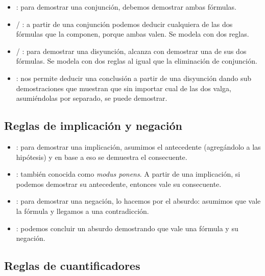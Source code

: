 \begin{itemize}
    \item {}: para demostrar una conjunción, debemos demostrar ambas fórmulas.
    \item {} / : a partir de una conjunción podemos
    deducir cualquiera de las dos fórmulas que la componen, porque ambas valen.
    Se modela con dos reglas.
    \item {} / : para demostrar una disyunción, alcanza con
    demostrar una de sus dos fórmulas. Se modela con dos reglas al igual que la
    eliminación de conjunción.
    \item {}: nos permite deducir una conclusión a partir de una
    disyunción dando sub demostraciones que muestran que sin importar cual de
    las dos valga, asumiéndolas por separado, se puede demostrar.
\end{itemize}

\subsection{Reglas de implicación y negación}

\begin{multicols}{2}
    \proofTreeImpI
    \proofTreeImpE
\end{multicols}

\proofSpacing

\begin{multicols}{2}
    \proofTreeNotI
    \proofTreeNotE
\end{multicols}

\begin{itemize}
    \item {}: para demostrar una implicación, asumimos el antecedente
    (agregándolo a las hipótesis) y en base a eso se demuestra el consecuente.
    \item {}: también conocida como \textit{modus ponens}. A partir de
    una implicación, si podemos demostrar su antecedente, entonces vale su consecuente.
    \item {}: para demostrar una negación, lo hacemos por el absurdo:
    asumimos que vale la fórmula y llegamos a una contradicción.
    \item {}: podemos concluir un absurdo demostrando que vale una
    fórmula y su negación.
\end{itemize}

\subsection{Reglas de cuantificadores}

